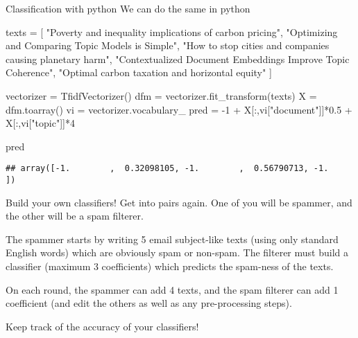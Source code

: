\documentclass[
  10pt,
  ignorenonframetext,
  aspectratio=169]{beamer}
\newenvironment{Shaded}{\begin{snugshade}}{\end{snugshade}}
\newcommand{\DecValTok}[1]{\textcolor[rgb]{0.86,0.86,0.80}{#1}}
\newcommand{\FloatTok}[1]{\textcolor[rgb]{0.75,0.75,0.82}{#1}}
\newcommand{\NormalTok}[1]{\textcolor[rgb]{0.80,0.80,0.80}{#1}}
\newcommand{\OperatorTok}[1]{\textcolor[rgb]{0.94,0.94,0.82}{#1}}
\newcommand{\StringTok}[1]{\textcolor[rgb]{0.80,0.58,0.58}{#1}}
\begin{document}
\begin{frame}[fragile]{Classification with python}
\protect\hypertarget{classification-with-python}{}
We can do the same in python

\scriptsize

\begin{Shaded}
\begin{Highlighting}[]
\NormalTok{texts }\OperatorTok{=}\NormalTok{ [}
  \StringTok{"Poverty and inequality implications of carbon pricing"}\NormalTok{,}
  \StringTok{"Optimizing and Comparing Topic Models is Simple"}\NormalTok{,}
  \StringTok{"How to stop cities and companies causing planetary harm"}\NormalTok{,}
  \StringTok{"Contextualized Document Embeddings Improve Topic Coherence"}\NormalTok{,}
  \StringTok{"Optimal carbon taxation and horizontal equity"}
\NormalTok{]}

\NormalTok{vectorizer }\OperatorTok{=}\NormalTok{ TfidfVectorizer()}
\NormalTok{dfm }\OperatorTok{=}\NormalTok{ vectorizer.fit\_transform(texts)}
\NormalTok{X }\OperatorTok{=}\NormalTok{ dfm.toarray()}
\NormalTok{vi }\OperatorTok{=}\NormalTok{ vectorizer.vocabulary\_}
\NormalTok{pred }\OperatorTok{=} \OperatorTok{{-}}\DecValTok{1} \OperatorTok{+}\NormalTok{ X[:,vi[}\StringTok{"document"}\NormalTok{]]}\OperatorTok{*}\FloatTok{0.5} \OperatorTok{+}\NormalTok{ X[:,vi[}\StringTok{"topic"}\NormalTok{]]}\OperatorTok{*}\DecValTok{4}

\NormalTok{pred}
\end{Highlighting}
\end{Shaded}

\begin{verbatim}
## array([-1.        ,  0.32098105, -1.        ,  0.56790713, -1.        ])
\end{verbatim}
\end{frame}

\begin{frame}{Build your own classifiers!}
\protect\hypertarget{build-your-own-classifiers}{}
Get into pairs again. One of you will be spammer, and the other will be
a spam filterer.

The spammer starts by writing 5 email subject-like texts (using only
standard English words) which are obviously spam or non-spam. The
filterer must build a classifier (maximum 3 coefficients) which predicts
the spam-ness of the texts.

On each round, the spammer can add 4 texts, and the spam filterer can
add 1 coefficient (and edit the others as well as any pre-processing
steps).

Keep track of the accuracy of your classifiers!
\end{frame}
\end{document}
